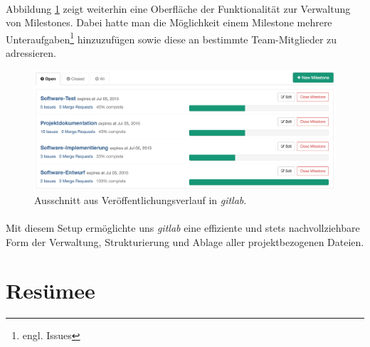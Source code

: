 \newpage
\paragraph{}Abbildung \ref{gl_milestone} zeigt weiterhin eine Oberfläche der Funktionalität zur Verwaltung von Milestones. Dabei hatte man die Möglichkeit einem Milestone mehrere Unteraufgaben\footnote{engl. Issues} hinzuzufügen sowie diese an bestimmte Team-Mitglieder zu adressieren.

\hspace*{1cm}
\begin{figure}[h!]
	\centering
	\includegraphics[width=\textwidth]{images/gl_milestones.png}
	\caption{Ausschnitt aus Veröffentlichungsverlauf in \textit{gitlab}.}
	\label{gl_milestone}
\end{figure}

\paragraph{}Mit diesem Setup ermöglichte uns \textit{gitlab} eine effiziente und stets nachvollziehbare Form der Verwaltung, Strukturierung und Ablage aller projektbezogenen Dateien.

\newpage
\section{Resümee}



